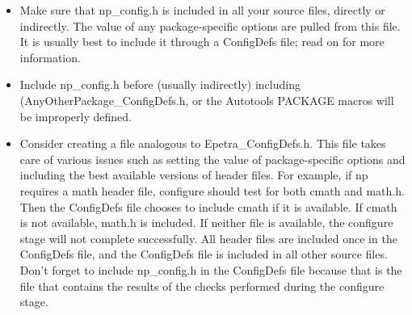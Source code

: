\documentclass[12pt,strict]{TrilinosDevGuide}
\begin{document}
\begin{itemize}
\item Make sure that np\_config.h is included in all your source
files, directly or indirectly.  The value of any package-specific options are 
pulled from this file.  It is usually best to include it through a 
ConfigDefs file; read on for more information.  

\item Include np\_config.h before (usually indirectly) including \newline
(AnyOtherPackage\_ConfigDefs.h, or the Autotools PACKAGE macros will 
be improperly defined.

\item Consider creating a file analogous to Epetra\_ConfigDefs.h.  This file 
takes care of various issues such as setting the value of package-specific 
options and including the best available versions of header files.  For 
example, if np requires a math header file, configure should test for both 
cmath and math.h.  Then the ConfigDefs file chooses to include cmath if it 
is available.  If cmath is not available, math.h is included.  If neither file 
is available, the configure stage will not complete successfully.  All header 
files are included once in the ConfigDefs file, and the ConfigDefs file is 
included in all other source files.  Don't forget to include np\_config.h in 
the ConfigDefs file because that is the file that contains the results of the 
checks performed during the configure stage.

\end{itemize}
\end{document}
